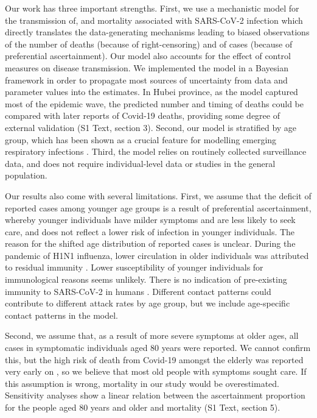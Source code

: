 \documentclass{article}
\begin{document}
Our work has three important strengths. 
First, we use a mechanistic model for the transmission of, and mortality associated with SARS-CoV-2 infection which directly translates the  data-generating mechanisms leading to biased observations of the number of deaths (because of right-censoring) and of cases (because of preferential ascertainment). 
Our model also accounts for the effect of control measures on disease transmission. 
We implemented the model in a Bayesian framework in order to propagate most sources of uncertainty from data and parameter values into the estimates.
In Hubei province, as the model captured most of the epidemic wave, the predicted number and timing of deaths could be compared with later reports of Covid-19 deaths, providing some degree of external validation (S1 Text, section 3).
Second, our model is stratified by age group, which has been shown as a crucial feature for modelling emerging respiratory infections \cite{pellis2020systematic}. 
Third, the model relies on routinely collected surveillance data, and does not require individual-level data or studies in the general population. 

Our results also come with several limitations. 
First, we assume that the deficit of reported cases among younger age groups is a result of preferential ascertainment, whereby younger individuals have milder symptoms and are less likely to seek care, and does not reflect a lower risk of infection in younger individuals. 
The reason for the shifted age distribution of reported cases is unclear. 
During the pandemic of H1N1 influenza, lower circulation in older individuals was attributed to residual immunity \cite{perez2009residual}. 
Lower susceptibility of younger individuals for immunological reasons seems unlikely. 
There is no indication of pre-existing immunity to SARS-CoV-2 in humans \cite{jointmission}. 
Different contact patterns could contribute to different attack rates by age group, but we include age-specific contact patterns in the model. 

Second, we assume that, as a result of more severe symptoms at older ages, all cases in symptomatic individuals aged 80 years were reported. We cannot confirm this, but the high risk of death from Covid-19 amongst the elderly was reported very early on \cite{huang2020clinical}, so we believe that most old people with symptoms sought care. If this assumption is wrong, mortality in our study would be overestimated. Sensitivity analyses show a linear relation between the ascertainment proportion for the people aged 80 years and older and mortality (S1 Text, section 5).
\end{document}
